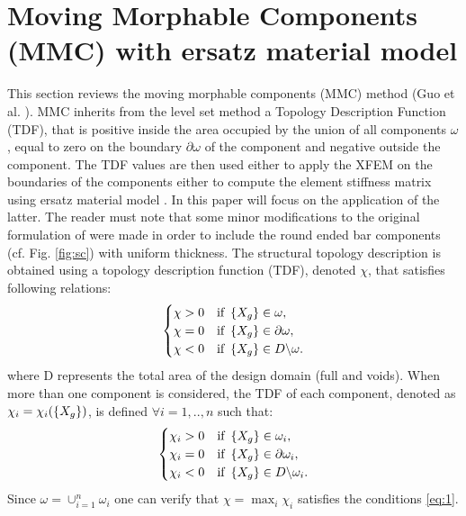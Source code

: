 \section{Moving Morphable Components (MMC) with ersatz material model}
\label{MMC}
This section reviews the moving morphable components (MMC) method (Guo et al.  \cite{guo2014doing,guo2016explicit}).
 MMC inherits from the level set method \cite{allaire2004structural} a Topology Description Function (TDF), that is positive inside the area occupied by the union of all components $\omega$, equal to zero on the boundary $\partial \omega$ of the component and negative outside the component. The TDF values are then used either to apply the XFEM \cite{wei2010study} on the boundaries of the components either to compute the element stiffness matrix using ersatz material model \cite{zhang2016new}. In this paper will focus on the application of the latter. 
 The reader must note that some minor modifications to the original formulation of \cite{zhang2016new} were made in order to include the round ended bar components (cf. Fig. \ref{fig:sc}) with uniform thickness.
The structural topology description is obtained using a topology description function (TDF), denoted $\chi$, that satisfies following relations:
\begin{equation}
\label{eq:1}
 \begin{cases}
              \chi >0 & \text{if } \left\{{X_g}\right\}\in \omega ,\\
               \chi =0  & \text{if } \left\{{X_g}\right\}\in \partial\omega,\\
               \chi <0 & \text{if } \left\{{X_g}\right\}\in D \backslash\omega.
          \end{cases}
\end{equation}
where D represents the total area of the design domain (full and voids). When more than one component is considered, the TDF of each component, denoted as $\chi_i=\chi_i(\left\{{X_g}\right\})$, is defined $ \forall i=1,..,n$ such that:
\begin{equation}
\label{eq:2}
 \begin{cases}
              \chi_i >0 & \text{if } \left\{{X_g}\right\}\in \omega_i ,\\
               \chi_i =0  & \text{if } \left\{{X_g}\right\}\in \partial\omega_i,\\
               \chi_i <0 & \text{if } \left\{{X_g}\right\}\in D \backslash\omega_i.
          \end{cases}
\end{equation}
Since $\omega=\cup_{i=1}^n{\omega_i}$ one can verify that $\chi=\max_{i}{\chi_i}$ satisfies the conditions \eqref{eq:1}.
